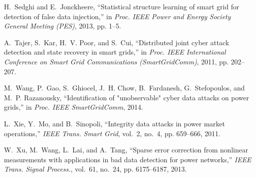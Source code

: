 \documentclass[conference,letterpaper,10pt]{IEEEtran}
\begin{document}
\begin{thebibliography}{10}
H.~Sedghi and E.~Jonckheere, ``Statistical structure learning of smart grid for
  detection of false data injection,'' in \emph{Proc. IEEE Power and Energy
  Society General Meeting (PES)}, 2013, pp. 1--5.

A.~Tajer, S.~Kar, H.~V. Poor, and S.~Cui, ``Distributed joint cyber attack
  detection and state recovery in smart grids,'' in \emph{Proc. IEEE
  International Conference on Smart Grid Communications (SmartGridComm)}, 2011,
  pp. 202--207.

M.~Wang, P.~Gao, S.~Ghiocel, J.~H. Chow, B.~Fardanesh, G.~Stefopoulos, and
  M.~P. Razanousky, ``Identification of "unobservable" cyber data attacks on
  power grids,'' in \emph{Proc. IEEE SmartGridComm}, 2014.

L.~Xie, Y.~Mo, and B.~Sinopoli, ``Integrity data attacks in power market
  operations,'' \emph{{IEEE} Trans. Smart Grid}, vol.~2, no.~4, pp. 659--666,
  2011.

W.~Xu, M.~Wang, L.~Lai, and A.~Tang, ``Sparse error correction from nonlinear
  measurements with applications in bad data detection for power networks,''
  \emph{{IEEE} Trans. Signal Process.}, vol.~61, no.~24, pp. 6175--6187, 2013.
\end{thebibliography}
\end{document}
